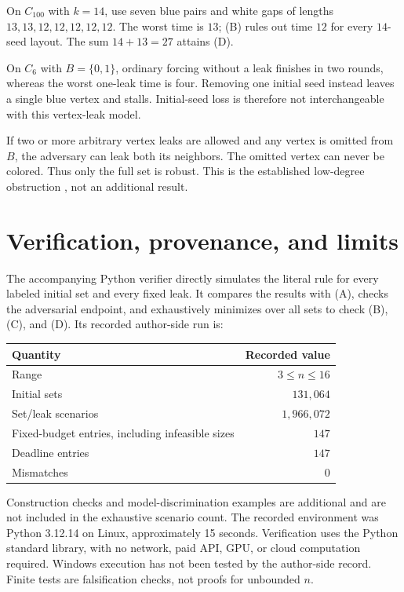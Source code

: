 \documentclass[11pt,a4paper]{article}
\begin{document}
On $C_{100}$ with $k=14$, use seven blue pairs and white gaps of lengths
$13,13,12,12,12,12,12$. The worst time is $13$; (B) rules out time $12$
for every $14$-seed layout. The sum $14+13=27$ attains (D).

On $C_6$ with $B=\{0,1\}$, ordinary forcing without a leak finishes in
two rounds, whereas the worst one-leak time is four. Removing one initial
seed instead leaves a single blue vertex and stalls. Initial-seed loss is
therefore not interchangeable with this vertex-leak model.

If two or more arbitrary vertex leaks are allowed and any vertex is omitted
from $B$, the adversary can leak both its neighbors. The omitted vertex can
never be colored. Thus only the full set is robust. This is the established
low-degree obstruction \cite[Lemma 2.4]{ADK2024}, not an additional result.

\section{Verification, provenance, and limits}

The accompanying Python verifier directly simulates the literal rule for
every labeled initial set and every fixed leak. It compares the results
with (A), checks the adversarial endpoint, and exhaustively minimizes over
all sets to check (B), (C), and (D). Its recorded author-side run is:
\begin{center}
\begin{tabular}{lr}
\toprule
Quantity & Recorded value\\
\midrule
Range & $3\leq n\leq16$\\
Initial sets & $131{,}064$\\
Set/leak scenarios & $1{,}966{,}072$\\
Fixed-budget entries, including infeasible sizes & $147$\\
Deadline entries & $147$\\
Mismatches & $0$\\
\bottomrule
\end{tabular}
\end{center}
Construction checks and model-discrimination examples are additional and are
not included in the exhaustive scenario count. The recorded environment was
Python 3.12.14 on Linux, approximately 15 seconds. Verification uses the
Python standard library, with no network, paid API, GPU, or cloud computation
required. Windows execution has not been tested by the author-side record.
Finite tests are falsification checks, not proofs for unbounded $n$.
\end{document}
